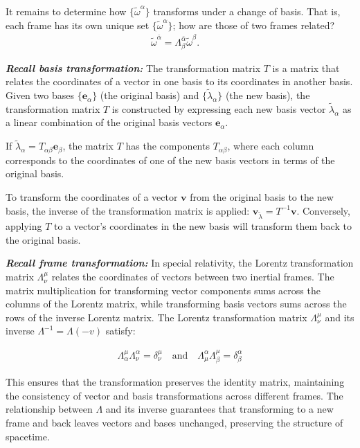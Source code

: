 \documentclass[12pt]{book}
\begin{document}
    It remains to determine how \(\{\tilde{\omega}^\alpha\}\) transforms under a change of basis. That is, each frame has its own unique set \(\{\tilde{\omega}^\alpha\}\); how are those of two frames related?
    \begin{align}
    \tilde{\omega}^{\bar{\alpha}} = \Lambda^{\bar{\alpha}}_{\beta} \tilde{\omega}^\beta. \quad \tag{3.13}
    \end{align}

    \textit{\textbf{Recall basis transformation: }} The transformation matrix \( T \) is a matrix that relates the coordinates of a vector in one basis to its coordinates in another basis. Given two bases \(\{\mathbf{e}_\alpha\}\) (the original basis) and \(\{\tilde{\lambda}_\alpha\}\) (the new basis), the transformation matrix \( T \) is constructed by expressing each new basis vector \(\tilde{\lambda}_\alpha\) as a linear combination of the original basis vectors \(\mathbf{e}_\alpha\). 

    If \( \tilde{\lambda}_\alpha = T_{\alpha\beta} \mathbf{e}_\beta \), the matrix \( T \) has the components \( T_{\alpha\beta} \), where each column corresponds to the coordinates of one of the new basis vectors in terms of the original basis. 
        
    To transform the coordinates of a vector \( \mathbf{v} \) from the original basis to the new basis, the inverse of the transformation matrix is applied: \( \mathbf{v}_{\tilde{\lambda}} = T^{-1} \mathbf{v} \). Conversely, applying \( T \) to a vector's coordinates in the new basis will transform them back to the original basis.

    \textbf{\textit{Recall frame transformation:}} In special relativity, the Lorentz transformation matrix \(\Lambda^\mu_\nu\) relates the coordinates of vectors between two inertial frames. The matrix multiplication for transforming vector components sums across the columns of the Lorentz matrix, while transforming basis vectors sums across the rows of the inverse Lorentz matrix. The Lorentz transformation matrix \(\Lambda^\mu_\nu\) and its inverse \(\Lambda^{-1} = \Lambda(-v)\) satisfy:

    \begin{align}
    \Lambda^\mu_\alpha \Lambda^\alpha_\nu = \delta^\mu_\nu
    \quad \text{and} \quad
    \Lambda^\alpha_\mu \Lambda^\mu_\beta = \delta^\alpha_\beta
    \end{align}
    
    This ensures that the transformation preserves the identity matrix, maintaining the consistency of vector and basis transformations across different frames. The relationship between \(\Lambda\) and its inverse guarantees that transforming to a new frame and back leaves vectors and bases unchanged, preserving the structure of spacetime.
\end{document}
